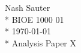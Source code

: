 \documentclass[12pt]{article}
\begin{document}
\noindent Nash Sauter \\*
\noindent BIOE 1000 01 \\*
\noindent \today \\*
\noindent Analysis Paper X

\Blindtext
\end{document}
